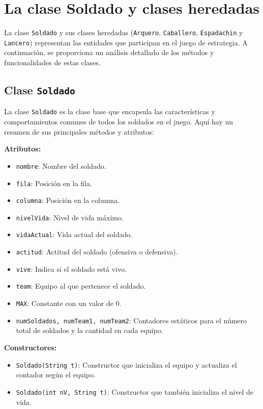 \section{La clase Soldado y clases heredadas}

La clase \texttt{Soldado} y sus clases heredadas (\texttt{Arquero}, \texttt{Caballero}, \texttt{Espadachin} y \texttt{Lancero}) representan las entidades que participan en el juego de estrategia. A continuación, se proporciona un análisis detallado de los métodos y funcionalidades de estas clases.

\subsection{Clase \texttt{Soldado}}

La clase \texttt{Soldado} es la clase base que encapsula las características y comportamientos comunes de todos los soldados en el juego. Aquí hay un resumen de sus principales métodos y atributos:

\textbf{Atributos:}
\begin{itemize}
    \item \texttt{nombre}: Nombre del soldado.
    \item \texttt{fila}: Posición en la fila.
    \item \texttt{columna}: Posición en la columna.
    \item \texttt{nivelVida}: Nivel de vida máximo.
    \item \texttt{vidaActual}: Vida actual del soldado.
    \item \texttt{actitud}: Actitud del soldado (ofensiva o defensiva).
    \item \texttt{vive}: Indica si el soldado está vivo.
    \item \texttt{team}: Equipo al que pertenece el soldado.
    \item \texttt{MAX}: Constante con un valor de 0.
    \item \texttt{numSoldados, numTeam1, numTeam2}: Contadores estáticos para el número total de soldados y la cantidad en cada equipo.
\end{itemize}

\textbf{Constructores:}
\begin{itemize}
    \item \texttt{Soldado(String t)}: Constructor que inicializa el equipo y actualiza el contador según el equipo.
    \item \texttt{Soldado(int nV, String t)}: Constructor que también inicializa el nivel de vida.
\end{itemize}

